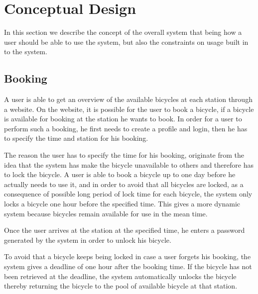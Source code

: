 \section{Conceptual Design}
In this section we describe the concept of the overall system that being how a user should be able to use the system, but also the constraints on usage built in to the system.

\subsection{Booking}
A user is able to get an overview of the available bicycles at each station through a website. 
On the website, it is possible for the user to book a bicycle, if a bicycle is available for booking at the station he wants to book. 
In order for a user to perform such a booking, he first needs to create a profile and login, then he has to specify the time and station for his booking.

The reason the user has to specify the time for his booking, originate from the idea that the system has make the bicycle unavailable to others and therefore has to lock the bicycle.
A user is able to book a bicycle up to one day before he actually needs to use it, and in order to avoid that all bicycles are locked, as a consequence of possible long period of lock time for each bicycle, the system only locks a bicycle one hour before the specified time.
This gives a more dynamic system because bicycles remain available for use in the mean time.

Once the user arrives at the station at the specified time, he enters a password generated by the system in order to unlock his bicycle.

To avoid that a bicycle keeps being locked in case a user forgets his booking, the system gives a deadline of one hour after the booking time.
If the bicycle has not been retrieved at the deadline, the system automatically unlocks the bicycle thereby returning the bicycle to the pool of available bicycle at that station. 

